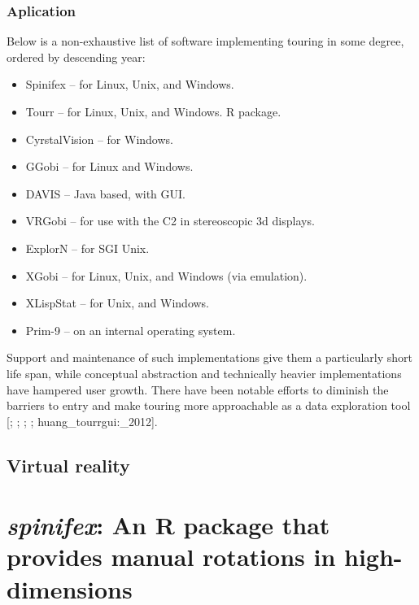 \documentclass{monashthesis}
\begin{document}
\subsection{Aplication}\label{aplication}

Below is a non-exhaustive list of software implementing touring in some
degree, ordered by descending year:

\begin{itemize}
\tightlist
\item
  Spinifex \autocite{spinifex} -- for Linux, Unix, and Windows.
\item
  Tourr \autocite{wickham_tourr_2011} -- for Linux, Unix, and Windows. R
  package.
\item
  CyrstalVision \autocite{wegman_visual_2003} -- for Windows.
\item
  GGobi \autocite{swayne_ggobi:_2003} -- for Linux and Windows.
\item
  DAVIS \autocite{huh_davis:_2002} -- Java based, with GUI.
\item
  VRGobi \autocite{nelson_xgobi_1998} -- for use with the C2 in
  stereoscopic 3d displays.
\item
  ExplorN \autocite{carr_explorn:_1996} -- for SGI Unix.
\item
  XGobi \autocite{swayne_xgobi:_1991} -- for Linux, Unix, and Windows
  (via emulation).
\item
  XLispStat \autocite{tierney_lisp-stat:_1990} -- for Unix, and Windows.
\item
  Prim-9 \autocites{asimov_grand_1985}{fisherkeller_prim-9:_1974} -- on
  an internal operating system.
\end{itemize}

Support and maintenance of such implementations give them a particularly
short life span, while conceptual abstraction and technically heavier
implementations have hampered user growth. There have been notable
efforts to diminish the barriers to entry and make touring more
approachable as a data exploration tool {[}\textcite{huh_davis:_2002};
\textcite{swayne_ggobi:_2003}; \textcite{wegman_visual_2003};
\textcite{wickham_tourr_2011}; huang\_tourrgui:\_2012{]}.

\section{Virtual reality}\label{virtual-reality}

\chapter{\texorpdfstring{\emph{spinifex}: An R package that provides
manual rotations in
high-dimensions}{spinifex: An R package that provides manual rotations in high-dimensions}}\label{ch:spinifex}
\end{document}
